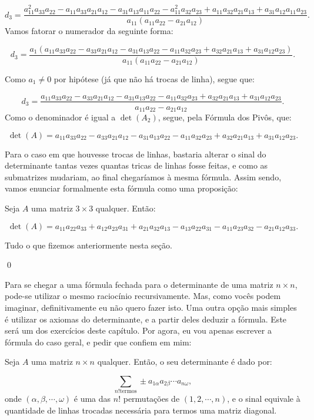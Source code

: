 $$
d_3 = \dfrac{a_{11}^2a_{33}a_{22} - a_{11}a_{33}a_{21}a_{12} - a_{31}a_{13}a_{11}a_{22} - a_{11}^2a_{32}a_{23} + a_{11}a_{32}a_{21}a_{13} + a_{31}a_{12}a_{11}a_{23}}{a_{11}(a_{11}a_{22} - a_{21}a_{12})}.
$$
Vamos fatorar o numerador da seguinte forma:

$$
d_3 = \dfrac{a_1(a_{11}a_{33}a_{22} - a_{33}a_{21}a_{12} - a_{31}a_{13}a_{22} - a_{11}a_{32}a_{23} + a_{32}a_{21}a_{13} + a_{31}a_{12}a_{23})}{a_{11}(a_{11}a_{22} - a_{21}a_{12})}.
$$

Como $a_1\neq 0$ por hipótese (já que não há trocas de linha), segue que:

$$
d_3 = \dfrac{a_{11}a_{33}a_{22} - a_{33}a_{21}a_{12} - a_{31}a_{13}a_{22} - a_{11}a_{32}a_{23} + a_{32}a_{21}a_{13} + a_{31}a_{12}a_{23}}{a_{11}a_{22} - a_{21}a_{12}}.
$$
Como o denominador é igual a $\det(A_2)$, segue, pela Fórmula dos Pivôs, que:

$$
\det(A) = a_{11}a_{33}a_{22} - a_{33}a_{21}a_{12} - a_{31}a_{13}a_{22} - a_{11}a_{32}a_{23} + a_{32}a_{21}a_{13} + a_{31}a_{12}a_{23}.
$$

Para o caso em que houvesse trocas de linhas, bastaria alterar o sinal do determinante tantas vezes quantas tricas de linhas fosse feitas, e como as submatrizes mudariam, ao final chegaríamos à mesma fórmula. Assim sendo, vamos enunciar formalmente esta fórmula como uma proposição:

\begin{Proposition}
	Seja $A$ uma matriz $3\times 3$ qualquer. Então:
	
	$$
	\det(A) = a_{11}a_{22}a_{33} + a_{12}a_{23}a_{31} + a_{21}a_{32}a_{13}- a_{13}a_{22}a_{31} - a_{11}a_{23}a_{32} - a_{21}a_{12}a_{33}.
	$$
\end{Proposition}

\begin{Proof}
	Tudo o que fizemos anteriormente nesta seção.
	
	\qed
\end{Proof}

Para se chegar a uma fórmula fechada para o determinante de uma matriz $n\times n$, pode-se utilizar o mesmo raciocínio recursivamente. Mas, como vocês podem imaginar, definitivamente eu não quero fazer isto. Uma outra opção mais simples é utilizar os axiomas do determinante, e a partir deles deduzir a fórmula. Este será um dos exercícios deste capítulo. Por agora, eu vou apenas escrever a fórmula do caso geral, e pedir que confiem em mim:

\begin{Theorem}
	Seja $A$ uma matriz $n\times n$ qualquer. Então, o seu determinante é dado por:
	
	$$
	\sum\limits_{n! \text{termos}}\pm a_{1\alpha}a_{2\beta}\cdots a_{n\omega},
	$$
	onde $(\alpha, \beta, \cdots, \omega)$ é uma das $n!$ permutações de $(1, 2, \cdots, n)$, e o sinal equivale à quantidade de linhas trocadas necessária para termos uma matriz diagonal.
\end{Theorem}

